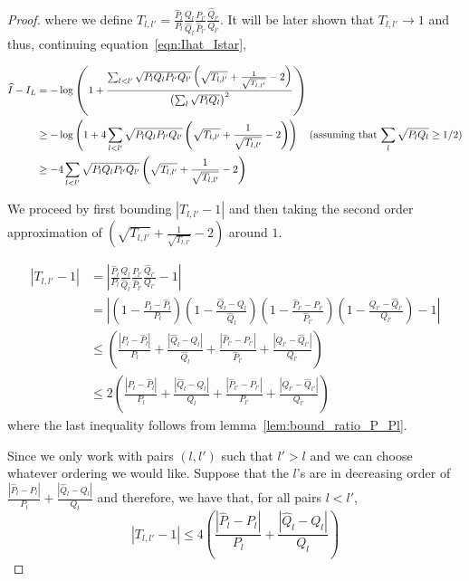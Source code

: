 \begin{proof}
where we define $T_{l,l'} = \frac{\hat{P}_l}{P_l} \frac{Q_l}{\hat{Q}_l} 
      \frac{P_{l'}}{\hat{P}_{l'}} \frac{\hat{Q}_{l'}}{Q_{l'}}  $. It will be later shown that $T_{l,l'} \rightarrow 1$ and thus, continuing equation~\ref{eqn:Ihat_Istar},

\begin{align}
\widehat{I} - I_L &= - \log \left( 1 + \frac{ \sum_{l<l'} \sqrt{P_l Q_l P_{l'} Q_{l'}} 
    \left( \sqrt{T_{l,l'}} + \frac{1}{\sqrt{T_{l,l'}}} - 2 \right)}
    { \left( \sum_l \sqrt{ P_l Q_l} \right)^2 }  \right) \nonumber \\
     &  \geq  - \log \left( 1 + 4 \sum_{l<l'} \sqrt{P_l Q_l P_{l'} Q_{l'}}  
    \left( \sqrt{T_{l,l'}} + \frac{1}{\sqrt{T_{l,l'}}} - 2 \right)  \right) 
  \quad \textrm{(assuming that $\sum_l \sqrt{P_l Q_l} \geq 1/2$)} \nonumber \\
   & \geq - 4 \sum_{l < l'} \sqrt{P_l Q_l P_{l'} Q_{l'}} 
    \left( \sqrt{T_{l,l'}} + \frac{1}{\sqrt{T_{l,l'}}} - 2 \right) \label{eqn:Ihat_Istar2}
\end{align}

We proceed by first bounding $|T_{l,l'} - 1|$ and then taking the second order approximation of $\left( \sqrt{T_{l,l'}} + \frac{1}{\sqrt{T_{l,l'}}} - 2 \right)$ around $1$. 

\begin{align*}
|T_{l,l'} - 1| &= \left| \frac{\hat{P}_l}{P_l} \frac{Q_l}{\hat{Q}_l} 
      \frac{P_{l'}}{\hat{P}_{l'}} \frac{\hat{Q}_{l'}}{Q_{l'}} - 1 \right| \\
 &= \left| \left( 1 - \frac{P_l - \hat{P}_l}{P_l} \right)
    \left( 1 - \frac{\hat{Q}_l - Q_l}{\hat{Q}_l} \right)
   \left( 1- \frac{\hat{P}_{l'} - P_{l'}}{\hat{P}_{l'}}\right)
   \left( 1 -  \frac{Q_{l'}- \hat{Q}_{l'}}{Q_{l'}} \right) -1 \right| \\
&\leq \left( \frac{|P_l - \hat{P}_l|}{P_l} +  \frac{|\hat{Q}_l - Q_l|}{\hat{Q}_l}
           +   \frac{| \hat{P}_{l'} - P_{l'}|}{\hat{P}_{l'}} +
               \frac{| Q_{l'} - \hat{Q}_{l'} | }{Q_{l'}} \right) \\
& \leq 2\left( \frac{|P_l - \hat{P}_l|}{P_l} +  \frac{|\hat{Q}_l - Q_l|}{Q_l}
           +   \frac{| \hat{P}_{l'} - P_{l'}|}{P_{l'}} +
               \frac{| Q_{l'} - \hat{Q}_{l'} | }{Q_{l'}} \right) 
\end{align*}
where the last inequality follows from lemma~\ref{lem:bound_ratio_P_Pl}.

Since we only work with pairs $(l, l')$ such that $l' > l$ and we can choose whatever ordering we would like. Suppose that the $l$'s are in decreasing order of $\frac{|\hat{P}_l - P_l|}{P_l} + \frac{|\hat{Q}_l - Q_l|}{Q_l}$ and therefore, we have that, for all pairs $l < l'$, 
\[
| T_{l,l'} - 1 | \leq 4
    \left( \frac{|\hat{P}_l - P_l|}{P_l} + \frac{|\hat{Q}_l - Q_l|}{Q_l} \right)
\]


\end{proof}
